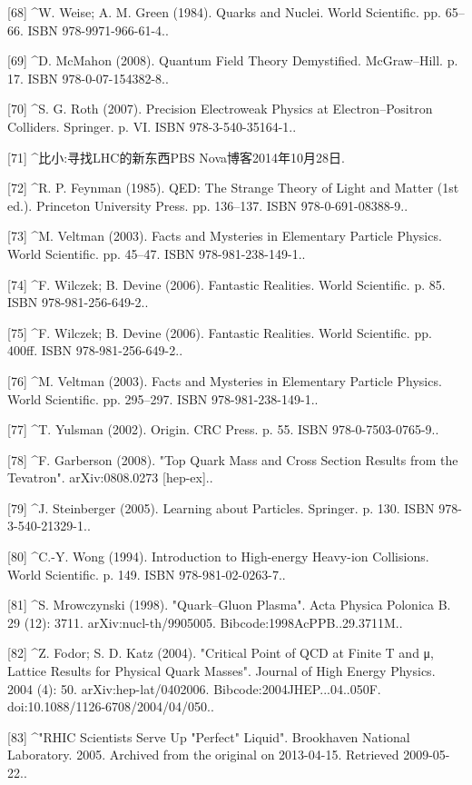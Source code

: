 [68]
^W. Weise; A. M. Green (1984). Quarks and Nuclei. World Scientific. pp. 65–66. ISBN 978-9971-966-61-4..

[69]
^D. McMahon (2008). Quantum Field Theory Demystified. McGraw–Hill. p. 17. ISBN 978-0-07-154382-8..

[70]
^S. G. Roth (2007). Precision Electroweak Physics at Electron–Positron Colliders. Springer. p. VI. ISBN 978-3-540-35164-1..

[71]
^比小:寻找LHC的新东西PBS Nova博客2014年10月28日.

[72]
^R. P. Feynman (1985). QED: The Strange Theory of Light and Matter (1st ed.). Princeton University Press. pp. 136–137. ISBN 978-0-691-08388-9..

[73]
^M. Veltman (2003). Facts and Mysteries in Elementary Particle Physics. World Scientific. pp. 45–47. ISBN 978-981-238-149-1..

[74]
^F. Wilczek; B. Devine (2006). Fantastic Realities. World Scientific. p. 85. ISBN 978-981-256-649-2..

[75]
^F. Wilczek; B. Devine (2006). Fantastic Realities. World Scientific. pp. 400ff. ISBN 978-981-256-649-2..

[76]
^M. Veltman (2003). Facts and Mysteries in Elementary Particle Physics. World Scientific. pp. 295–297. ISBN 978-981-238-149-1..

[77]
^T. Yulsman (2002). Origin. CRC Press. p. 55. ISBN 978-0-7503-0765-9..

[78]
^F. Garberson (2008). "Top Quark Mass and Cross Section Results from the Tevatron". arXiv:0808.0273 [hep-ex]..

[79]
^J. Steinberger (2005). Learning about Particles. Springer. p. 130. ISBN 978-3-540-21329-1..

[80]
^C.-Y. Wong (1994). Introduction to High-energy Heavy-ion Collisions. World Scientific. p. 149. ISBN 978-981-02-0263-7..

[81]
^S. Mrowczynski (1998). "Quark–Gluon Plasma". Acta Physica Polonica B. 29 (12): 3711. arXiv:nucl-th/9905005. Bibcode:1998AcPPB..29.3711M..

[82]
^Z. Fodor; S. D. Katz (2004). "Critical Point of QCD at Finite T and μ, Lattice Results for Physical Quark Masses". Journal of High Energy Physics. 2004 (4): 50. arXiv:hep-lat/0402006. Bibcode:2004JHEP...04..050F. doi:10.1088/1126-6708/2004/04/050..

[83]
^"RHIC Scientists Serve Up "Perfect" Liquid". Brookhaven National Laboratory. 2005. Archived from the original on 2013-04-15. Retrieved 2009-05-22..

